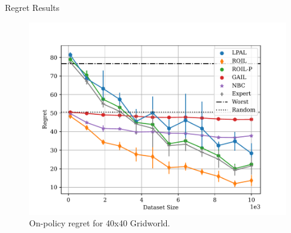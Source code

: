 \begin{block}{Regret Results}
    \begin{center}
        \begin{figure}
            \includegraphics[]{../pres_roil/plots/regrets/40x40_gridworld_on_policy_regret_regrets.pdf}
            \caption{On-policy regret for 40x40 Gridworld.}
        \end{figure}
    \end{center}
\end{block}
